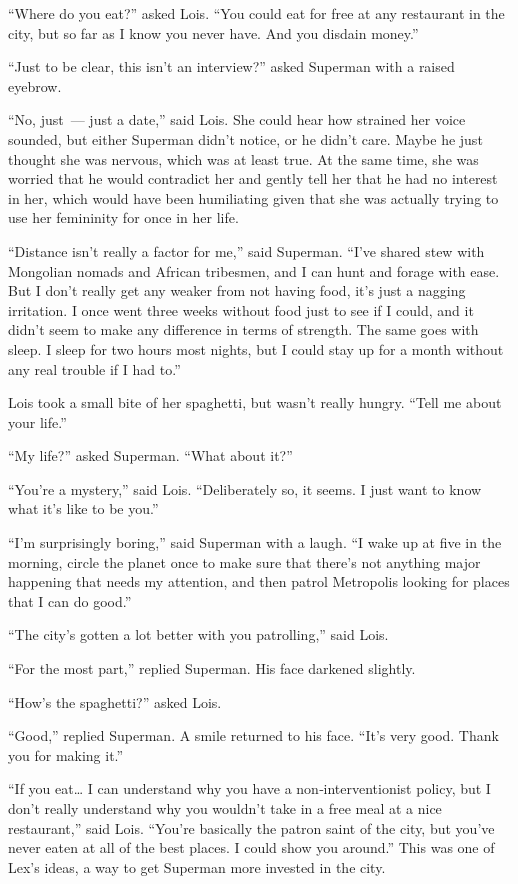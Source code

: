 \documentclass[ebook,12pt]{memoir}
\begin{document}
``Where do you eat?'' asked Lois. ``You could eat for free at any
restaurant in the city, but so far as I know you never have. And you
disdain money.''

``Just to be clear, this isn't an interview?'' asked Superman with a
raised eyebrow.

``No, just~--- just a date,'' said Lois. She could hear how strained her
voice sounded, but either Superman didn't notice, or he didn't care.
Maybe he just thought she was nervous, which was at least true. At the
same time, she was worried that he would contradict her and gently tell
her that he had no interest in her, which would have been humiliating
given that she was actually trying to use her femininity for once in her
life.

``Distance isn't really a factor for me,'' said Superman. ``I've shared
stew with Mongolian nomads and African tribesmen, and I can hunt and
forage with ease. But I don't really get any weaker from not having
food, it's just a nagging irritation. I once went three weeks without
food just to see if I could, and it didn't seem to make any difference
in terms of strength. The same goes with sleep. I sleep for two hours
most nights, but I could stay up for a month without any real trouble if
I had to.''

Lois took a small bite of her spaghetti, but wasn't really hungry.
``Tell me about your life.''

``My life?'' asked Superman. ``What about it?''

``You're a mystery,'' said Lois. ``Deliberately so, it seems. I just
want to know what it's like to be you.''

``I'm surprisingly boring,'' said Superman with a laugh. ``I wake up at
five in the morning, circle the planet once to make sure that there's
not anything major happening that needs my attention, and then patrol
Metropolis looking for places that I can do good.''

``The city's gotten a lot better with you patrolling,'' said Lois.

``For the most part,'' replied Superman. His face darkened slightly.

``How's the spaghetti?'' asked Lois.

``Good,'' replied Superman. A smile returned to his face. ``It's very
good. Thank you for making it.''

``If you eat\ldots{} I can understand why you have a non‐interventionist
policy, but I don't really understand why you wouldn't take in a free
meal at a nice restaurant,'' said Lois. ``You're basically the patron
saint of the city, but you've never eaten at all of the best places. I
could show you around.'' This was one of Lex's ideas, a way to get
Superman more invested in the city.
\end{document}
